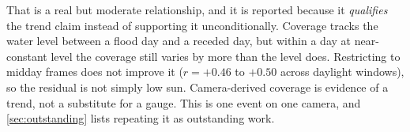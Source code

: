 That is a real but moderate relationship, and it is reported because it
\emph{qualifies} the trend claim instead of supporting it unconditionally.
Coverage tracks the water level between a flood day and a receded day, but
within a day at near-constant level the coverage still varies by more than the
level does. Restricting to midday frames does not improve it ($r = +0.46$ to
$+0.50$ across daylight windows), so the residual is not simply low sun.
Camera-derived coverage is evidence of a trend, not a substitute for a gauge.
This is one event on one camera, and \cref{sec:outstanding} lists repeating it
as outstanding work.
